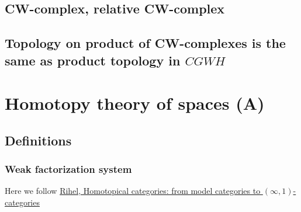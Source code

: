 \begin{remark}
\subsection{CW-complex, relative CW-complex}
\subsection{Topology on product of CW-complexes is the same as product topology in $CGWH$}

\section{Homotopy theory  of spaces (A)}
\subsection{Definitions}
\subsubsection{Weak factorization system}

Here we follow \href{https://arxiv.org/pdf/1904.0088}{Rihel, Homotopical categories: from model categories to $(\infty,1)$-categories}


\end{remark}

